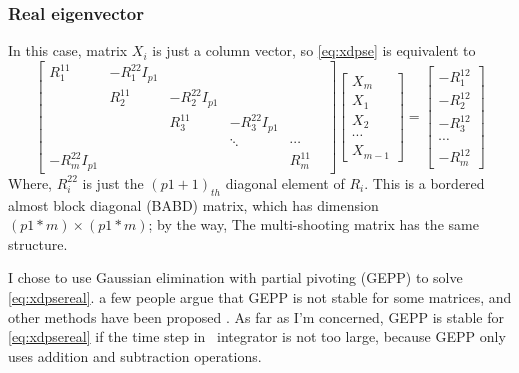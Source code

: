 \subsubsection{Real eigenvector}
In this case, matrix $X_{i}$ is just a column vector, so
\eqref{eq:xdpse} is equivalent to
\begin{equation}
  \label{eq:xdpsereal}
  \begin{bmatrix}
    R^{11}_{1} & -R^{22}_{1}I_{p1} &  & \\[1em]
    & R^{11}_{2} & -R^{22}_{2}I_{p1} &  &\\[1em]
    &  & R^{11}_{3} & -R^{22}_{3}I_{p1} &  &\\[1em]
    & & & \ddots &\cdots & \\[1em]
    -R^{22}_{m}I_{p1} & & & & R^{11}_{m}
  \end{bmatrix}
  \begin{bmatrix}
    X_{m} \\[1em]
    X_{1}  \\[1em]
    X_{2}  \\[1em]
    \cdots \\[1em]
    X_{m-1}
  \end{bmatrix}
  =
  \begin{bmatrix}
    -R^{12}_{1} \\[1em]
    -R^{12}_{2} \\[1em]
    -R^{12}_{3} \\[1em]
    \cdots \\[1em]
    -R^{12}_{m}
  \end{bmatrix}
\end{equation}
Where, $R^{22}_{i}$ is just the $(p1+1)_{th}$ diagonal element of $R_{i}$.
This is a bordered almost block diagonal (BABD) matrix, which has
dimension $(p1*m)\times (p1*m)$; by the way, The multi-shooting
 matrix has the same structure.

I chose to use Gaussian  elimination with partial pivoting (GEPP)
to solve \eqref{eq:xdpsereal}. a few people  argue
that GEPP is not
stable for some matrices, and other methods have been proposed
. As far as I'm concerned, GEPP is stable for
\eqref{eq:xdpsereal} if the time step in \KS\ integrator is
not too large, because GEPP only uses addition and subtraction
operations.


